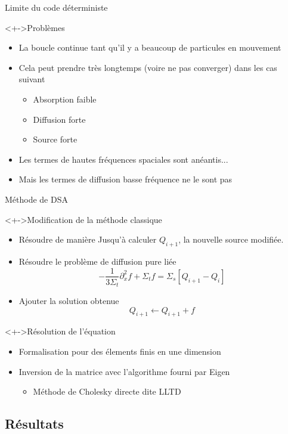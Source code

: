 \documentclass[17pt]{beamer}
\newenvironment{blockitemize}[1]{
  \begin{block}<+->{#1}
    \begin{itemize}
    }{
    \end{itemize}
  \end{block}
}
\begin{document}
\begin{frame}{Limite du code déterministe}
  \begin{blockitemize}{Problèmes} 
  \item La boucle continue tant qu'il y a beaucoup de particules en mouvement
  \item Cela peut prendre très longtemps (voire ne pas converger) dans les cas suivant
    \begin{itemize}
    \item Absorption faible
    \item Diffusion forte
    \item Source forte
    \end{itemize}
  \item Les termes de hautes fréquences spaciales sont anéantis...
  \item Mais les termes de diffusion basse fréquence ne le sont pas 
  \end{blockitemize}
\end{frame}

\begin{frame}{Méthode de DSA}
  \begin{blockitemize}{Modification de la méthode classique} 
  \item Résoudre de manière Jusqu'à calculer $Q_{i+1}$, la nouvelle source modifiée.
  \item Résoudre le problème de diffusion pure liée
    \[
      -\frac{1}{3\Sigma_t}\partial_x^2 f + \Sigma_t f = \Sigma_s [Q_{i+1}-Q_i] 
    \]
  \item Ajouter la solution obtenue
    \[
      Q_{i+1} \leftarrow Q_{i+1} + f 
    \]
  \end{blockitemize}

  \begin{blockitemize}{Résolution de l'équation}
  \item Formalisation pour des élements finis en une dimension
  \item Inversion de la matrice avec l'algorithme fourni par Eigen
    \begin{itemize}
    \item Méthode de Cholesky directe dite LLTD
    \end{itemize}
  \end{blockitemize}
\end{frame}


\subsection{Résultats}
\end{document}

